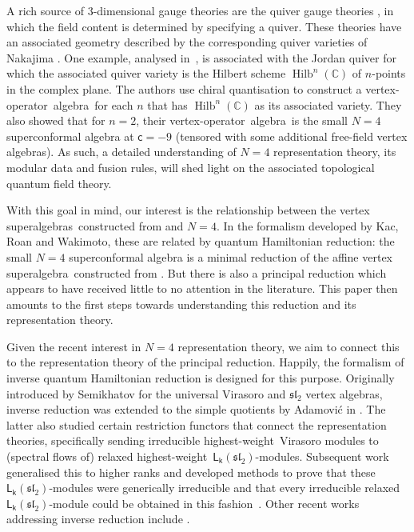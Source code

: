 \documentclass[pdftex]{sigma}
\numberwithin{equation}{section}
\newcommand{\cc}{\mathsf{c}} %
\newcommand{\kk}{\mathsf{k}} %
\newcommand{\fld}[1]{\mathbb{#1}} %
\newcommand{\alg}[1]{\mathfrak{#1}} %
\newcommand{\VOA}[1]{\mathsf{#1}} %
\newcommand{\CC}{\fld{C}}
\newcommand{\SLA}[2]{\alg{#1}_{#2}} %
\newcommand{\SLSA}[3]{\alg{#1}_{#2 \vert #3}} %
\newcommand{\sltwo}{\SLA{sl}{2}}
\newcommand{\psl}{\SLSA{psl}{2}{2}}
\newcommand{\saff}[2]{\VOA{L}_{#1}(#2)} %
\newcommand{\ssl}[1][\kk]{\saff{#1}{\sltwo}} %
\newcommand{\hw}{highest-weight}
\newcommand{\rhw}{relaxed highest-weight}
\newcommand{\vo}{vertex-operator}
\newcommand{\voa}{\vo\ algebra}
\newcommand{\sva}{vertex superalgebra}
\newcommand{\svas}{\sva s}
\newcommand{\qhr}{quantum Hamiltonian reduction} %
\begin{document}
A rich source of $3$-dimensional gauge theories are the quiver gauge theories \cite{DouDbr96}, in which the field content is determined by specifying a quiver.
These theories have an associated geometry described by the corresponding quiver varieties of Nakajima \cite{NakIns94,NakQui98}.
One example, analysed in~\cite{AraHil23}, is associated with the Jordan quiver for which the associated quiver variety is the Hilbert scheme $\operatorname{Hilb}^{n}(\CC)$ of $n$-points in the complex plane.
The authors use chiral quantisation to construct a \voa\ for each $n$ that has $\operatorname{Hilb}^{n}(\CC)$ as its associated variety.
They also showed that for $n=2$, their \voa\ is the small $N=4$ superconformal algebra at $\cc = -9$ (tensored with some additional free-field vertex algebras).
As such, a detailed understanding of $N=4$ representation theory, its modular data and fusion rules, will shed light on the associated topological quantum field theory.

With this goal in mind, our interest is the relationship between the \svas\ constructed from \smash{$\psl$} and $N=4$.
In the formalism developed by Kac, Roan and Wakimoto, these are related by \qhr: the small $N=4$ superconformal algebra is a minimal reduction of the affine \sva\ constructed from \smash{$\psl$} \cite{KacQua03,KacQua03b}.
But there is also a principal reduction which appears to have received little to no attention in the literature.
This paper then amounts to the first steps towards understanding this reduction and its representation theory.

Given the recent interest in $N=4$ representation theory, we aim to connect this to the representation theory of the principal reduction.
Happily, the formalism of inverse quantum Hamiltonian reduction is designed for this purpose.
Originally introduced by Semikhatov \cite{SemInv94} for the universal Virasoro and $\sltwo$ vertex algebras, inverse reduction was extended to the simple quotients by Adamovi\'{c} in \cite{AdaRea17}.
The latter also studied certain restriction functors that connect the representation theories, specifically sending irreducible \hw\ Virasoro modules to (spectral flows of) \rhw\ $\ssl$-modules.
Subsequent work generalised this to higher ranks and developed methods to prove that these $\ssl$-modules were generically irreducible \cite{AdaRea20} and that every irreducible relaxed $\ssl$-module could be obtained in this fashion~\cite{AdaWei23}.
Other recent works addressing inverse reduction include \cite{AdaNap24,AdaRel21,CreSL225,FasCon24,FasVir24,FasMod24,FehSub21,FehInv23,FehMod21}.
\end{document}
